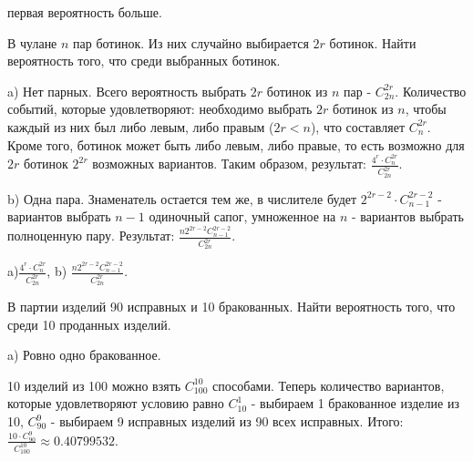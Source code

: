 \medskip
\begin{result}
первая вероятность больше.
\end{result}


\medskip
\begin{task}{7}
В чулане $n$ пар ботинок. Из них случайно выбирается $2r$ ботинок. Найти
вероятность того, что среди выбранных ботинок.
\end{task}

\begin{subtask}{a)}
Нет парных. Всего вероятность выбрать $2r$ ботинок из $n$ пар - $C_{2n}^{2r}$. 
Количество событий, которые удовлетворяют: необходимо выбрать $2r$ ботинок из $n$, чтобы
каждый из них был либо левым, либо правым ($2r < n$), что составляет $C_n^{2r}$. Кроме того, 
ботинок может быть либо левым, либо правые, то есть возможно для $2r$ ботинок $2^{2r}$ возможных
вариантов. Таким образом, результат:  $\frac{4^r\cdot C_{n}^{2r}}{C_{2n}^{2r}}$.
\end{subtask}

\begin{subtask}{b)}
Одна пара. Знаменатель остается тем же, в числителе будет $2^{2r - 2} \cdot C_{n - 1}^{2r - 2}$ - вариантов
выбрать $n - 1$ одиночный сапог, умноженное на $n$ - вариантов выбрать полноценную пару. Результат: 
$\frac{n 2^{2r - 2}C_{n- 1}^{2r - 2}}{C_{2n}^{2r}}$.
\end{subtask}

\medskip
\begin{result}
a)$\frac{4^r\cdot C_{n}^{2r}}{C_{2n}^{2r}}$, b) $\frac{n 2^{2r - 2}C_{n- 1}^{2r - 2}}{C_{2n}^{2r}}$.
\end{result}


\medskip
\begin{task}{8}
В партии изделий 90 исправных и 10 бракованных. Найти вероятность того, что среди
10 проданных изделий.
\end{task}


\begin{subtask}{a)}
Ровно одно бракованное.
\end{subtask}

\begin{solution}
10 изделий из 100 можно взять $C_{100}^{10}$ способами. Теперь количество вариантов, 
которые удовлетворяют условию равно $C_{10}^1$ - выбираем 1 бракованное изделие из 10, $C_{90}^{9}$ 
- выбираем 9 исправных изделий из 90 всех исправных. Итого: $\frac{10 \cdot C_{90}^{9}}{C_{100}^{10}}
\approx 0.40799532$.
\end{solution}


